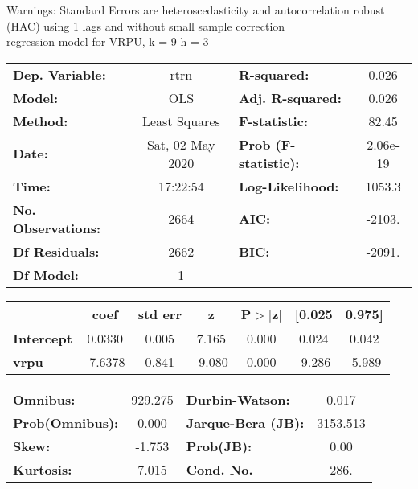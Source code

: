 Warnings: \newline
 [1] Standard Errors are heteroscedasticity and autocorrelation robust (HAC) using 1 lags and without small sample correction\\ 

regression model for VRPU, k = 9 h = 3\begin{center}
\begin{tabular}{lclc}
\toprule
\textbf{Dep. Variable:}    &       rtrn       & \textbf{  R-squared:         } &     0.026   \\
\textbf{Model:}            &       OLS        & \textbf{  Adj. R-squared:    } &     0.026   \\
\textbf{Method:}           &  Least Squares   & \textbf{  F-statistic:       } &     82.45   \\
\textbf{Date:}             & Sat, 02 May 2020 & \textbf{  Prob (F-statistic):} &  2.06e-19   \\
\textbf{Time:}             &     17:22:54     & \textbf{  Log-Likelihood:    } &    1053.3   \\
\textbf{No. Observations:} &        2664      & \textbf{  AIC:               } &    -2103.   \\
\textbf{Df Residuals:}     &        2662      & \textbf{  BIC:               } &    -2091.   \\
\textbf{Df Model:}         &           1      & \textbf{                     } &             \\
\bottomrule
\end{tabular}
\begin{tabular}{lcccccc}
                   & \textbf{coef} & \textbf{std err} & \textbf{z} & \textbf{P$> |$z$|$} & \textbf{[0.025} & \textbf{0.975]}  \\
\midrule
\textbf{Intercept} &       0.0330  &        0.005     &     7.165  &         0.000        &        0.024    &        0.042     \\
\textbf{vrpu}      &      -7.6378  &        0.841     &    -9.080  &         0.000        &       -9.286    &       -5.989     \\
\bottomrule
\end{tabular}
\begin{tabular}{lclc}
\textbf{Omnibus:}       & 929.275 & \textbf{  Durbin-Watson:     } &    0.017  \\
\textbf{Prob(Omnibus):} &   0.000 & \textbf{  Jarque-Bera (JB):  } & 3153.513  \\
\textbf{Skew:}          &  -1.753 & \textbf{  Prob(JB):          } &     0.00  \\
\textbf{Kurtosis:}      &   7.015 & \textbf{  Cond. No.          } &     286.  \\
\bottomrule
\end{tabular}
\end{center}

